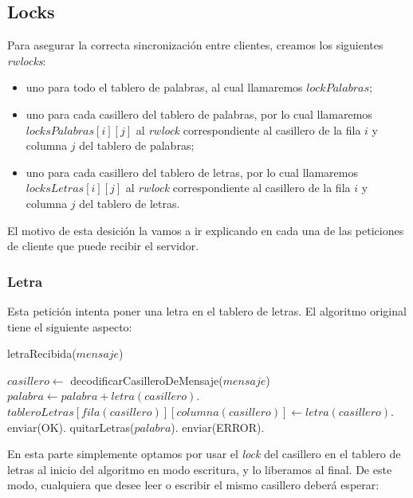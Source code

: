 \subsection{Locks}

Para asegurar la correcta sincronización entre clientes, creamos los siguientes \emph{rwlocks}:

\begin{itemize}

    \item uno para todo el tablero de palabras, al cual llamaremos $lockPalabras$;
    
    \item uno para cada casillero del tablero de palabras, por lo cual llamaremos $locksPalabras[i][j]$ al \emph{rwlock} correspondiente al casillero de la fila $i$ y columna $j$ del tablero de palabras;
    
    \item uno para cada casillero del tablero de letras, por lo cual llamaremos $locksLetras[i][j]$ al \emph{rwlock} correspondiente al casillero de la fila $i$ y columna $j$ del tablero de letras.

\end{itemize}

El motivo de esta desición la vamos a ir explicando en cada una de las peticiones de cliente que puede recibir el servidor.

\subsubsection{Letra}

Esta petición intenta poner una letra en el tablero de letras. El algoritmo original tiene el siguiente aspecto:

\begin{algorithm}[H]
\caption{letraRecibida($mensaje$)}
\begin{algorithmic}[1]
    \STATE $casillero \leftarrow$ decodificarCasilleroDeMensaje($mensaje$)
        \STATE $palabra \leftarrow palabra + letra(casillero)$.
        \STATE $tableroLetras[fila(casillero)][columna(casillero)] \leftarrow letra(casillero)$.
        \STATE enviar(OK).
    \ELSE
        \STATE quitarLetras($palabra$).
        \STATE enviar(ERROR).
    \ENDIF
\end{algorithmic}
\end{algorithm}

\noindent En esta parte simplemente optamos por usar el \emph{lock} del casillero en el tablero de letras al inicio del algoritmo en modo escritura, y lo liberamos al final. De este modo, cualquiera que desee leer o escribir el mismo casillero deberá esperar:

